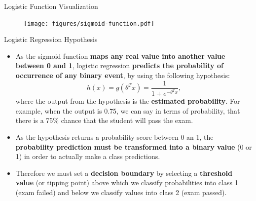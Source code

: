 \documentclass[main.tex]{subfiles}
\begin{document}
    \begin{frame}{Logistic Function Visualization}
        \begin{figure}
            \label{fig:sigmoid-function}
            \texttt{[image: figures/sigmoid-function.pdf]}
        \end{figure}
    \end{frame}

    \begin{frame}{Logistic Regression Hypothesis}
        \begin{itemize}
            \item As the sigmoid function \textbf{maps any real value into another value between 0 and 1}, logistic regression \textbf{predicts the probability of occurrence of any binary event}, by using the following hypothesis:
            $$h(x) = g(\theta^Tx) = \frac{1}{1 + e^{-\theta^Tx}},$$
            where the output from the hypothesis is the \textbf{estimated probability}. For example, when the output is 0.75, we can say in terms of probability, that there is a 75\% chance that the student will pass the exam.
            \item As the hypothesis returns a probability score between 0 an 1, the \textbf{probability prediction must be transformed into a binary value} (0 or 1) in order to actually make a class predictions.
            \item Therefore we must set a \textbf{decision boundary} by selecting a \textbf{threshold value} (or tipping point) above which we classify probabilities into class 1 (exam failed) and below we classify values into class 2 (exam passed).
        \end{itemize}
    \end{frame}
\end{document}
